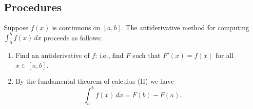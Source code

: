 \subsection*{Procedures}
\begin{namedtheorem} Suppose $f(x)$ is continuous on $[a,b]$. The antiderivative method for computing $\int_a^b f(x)\, dx$ proceeds as follows:
  \begin{enumerate}
    \item Find an antiderivative of $f$: i.e., find $F$ such that $F'(x)=f(x)$ for all $x\in [a,b]$.
    \item By the fundamental theorem of calculus (II) we have
    \[
      \int_a^bf(x)\, dx=F(b)-F(a).
    \]
  \end{enumerate}

\end{namedtheorem}

